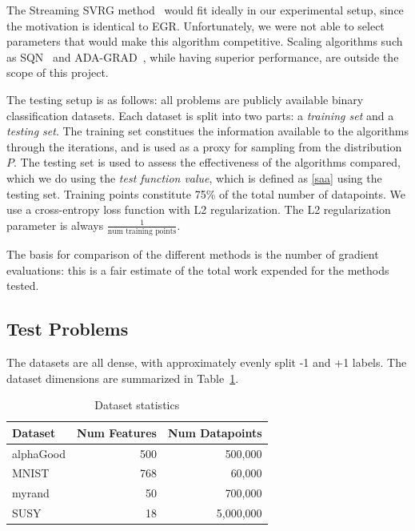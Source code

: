 \documentclass[11pt]{article}
\begin{document}
The Streaming SVRG method~\cite{Frostig:2014aa} would fit ideally in our experimental setup, since the motivation is identical to EGR. Unfortunately, we were not able to select parameters that would make this algorithm competitive. Scaling algorithms such as SQN~\cite{sammy} and ADA-GRAD~\cite{duchihazansing}, while having superior performance, are outside the scope of this project.
 
 The testing setup is as follows: all problems are publicly available binary classification datasets. Each dataset is split into two parts: a \emph{training set} and a \emph{testing set}. The training set constitues the information available to the algorithms through the iterations, and is used as a proxy for sampling from the distribution $P$. The testing set is used to assess the effectiveness of the algorithms compared, which we do using the \emph{test function value}, which is defined as \eqref{saa} using the testing set. Training points constitute 75\% of the total number of datapoints. We use a cross-entropy loss function with L2 regularization. The L2 regularization parameter is always $\frac{1}{\mbox{num training points}}$.

 The basis for comparison of the different methods is the number of gradient evaluations: this is a fair estimate of the total work expended for the methods tested.
 
 
   \subsection{Test Problems}

The datasets are all dense, with approximately evenly split -1 and +1 labels. The dataset dimensions are summarized in Table~\ref{table:sizes}.

\begin{table}[htb!]	%
	\centering
	\begin{tabular}{lrr}
		\toprule
		\textbf{Dataset} & \textbf{Num Features} & \textbf{Num Datapoints}\\
		\midrule
		             alphaGood &              500 &              500,000\\
		             MNIST &              768 &              60,000\\
		             myrand &              50 &              700,000\\
		             SUSY &              18 &              5,000,000\\
		\bottomrule
	\end{tabular}
	\caption{Dataset statistics}
	\label{table:sizes}
\end{table}
\end{document}
